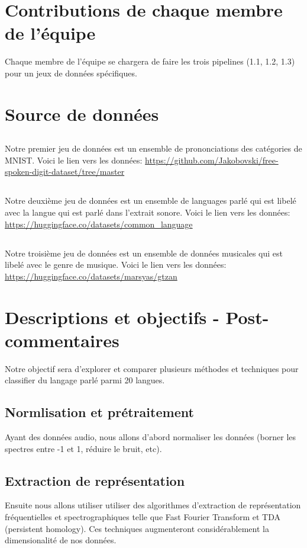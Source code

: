 \documentclass{article}
\begin{document}
\section{Contributions de chaque membre de l'équipe}
Chaque membre de l'équipe se chargera de faire les trois pipelines (1.1, 1.2, 1.3) pour un jeux de données spécifiques.\\
\section{Source de données}
\subsection{}
Notre premier jeu de données est un ensemble de prononciations des catégories de MNIST. Voici le lien vers les données: \href{https://github.com/Jakobovski/free-spoken-digit-dataset/tree/master}{https://github.com/Jakobovski/free-spoken-digit-dataset/tree/master}
\subsection{}
Notre deuxième jeu de données est un ensemble de languages parlé qui est libelé avec la langue qui est parlé dans l'extrait sonore. Voici le lien vers les données: \href{https://huggingface.co/datasets/common_language}{https://huggingface.co/datasets/common_language}
\subsection{}
Notre troisième jeu de données est un ensemble de données musicales qui est libelé avec le genre de musique. Voici le lien vers les données: \href{https://huggingface.co/datasets/marsyas/gtzan}{https://huggingface.co/datasets/marsyas/gtzan}

\section*{Descriptions et objectifs - Post-commentaires}
Notre objectif sera d'explorer et comparer plusieurs méthodes et techniques pour classifier du langage parlé parmi 20 langues. 
\subsection*{Normlisation et prétraitement}
Ayant des données audio, nous allons d'abord normaliser les données (borner les spectres entre -1 et 1, réduire le bruit, etc). 
\subsection*{Extraction de représentation}Ensuite nous allons utiliser utiliser des algorithmes d'extraction de représentation fréquentielles et spectrographiques telle que Fast Fourier Transform et TDA (persistent homology). Ces techniques augmenteront considérablement la dimensionalité de nos données. 
\end{document}
